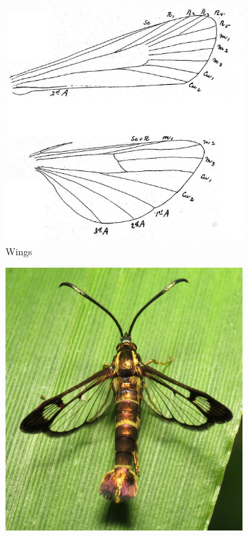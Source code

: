 \documentclass[letterpaper, 11pt]{article}
\begin{document}
\begin{figure}[ht!]
    \centering
    \begin{subfigure}[ht!]{0.4\textwidth}
        \includegraphics[width=\textwidth]{SesiidWings}
        \caption{Wings \citep[][Fig. 8]{bhl118765}}
        \label{fig:sesiid1}
    \end{subfigure}
    \hfill %
    \begin{subfigure}[ht!]{0.40\textwidth}
        \includegraphics[width=\textwidth]{SesiidHabitus}

\end{subfigure}
\end{figure}
\end{document}
